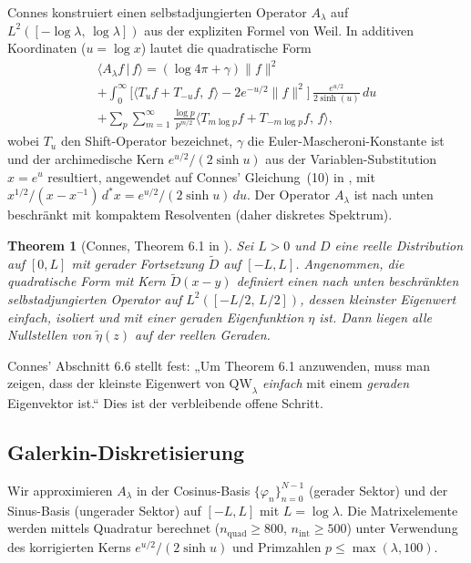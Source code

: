 \documentclass[12pt,a4paper]{article}
\newtheorem{theorem}{Theorem}[section]
\theoremstyle{definition}
\theoremstyle{remark}
\begin{document}
Connes konstruiert einen selbstadjungierten Operator $A_\lambda$ auf $L^2([-\log\lambda,\,\log\lambda])$ aus der expliziten Formel von Weil. In additiven Koordinaten ($u = \log x$) lautet die quadratische Form
\begin{multline*}
  \langle A_\lambda f \,|\, f \rangle = (\log 4\pi + \gamma)\|f\|^2 \\
  + \int_0^\infty \Big[\langle T_u f + T_{-u} f,\, f \rangle - 2e^{-u/2}\|f\|^2\Big]\,\frac{e^{u/2}}{2\sinh(u)}\,du \\
  + \sum_p \sum_{m=1}^\infty \frac{\log p}{p^{m/2}} \langle T_{m\log p} f + T_{-m\log p} f,\, f \rangle,
\end{multline*}
wobei $T_u$ den Shift-Operator bezeichnet, $\gamma$ die Euler-Mascheroni-Konstante ist und der archimedische Kern $e^{u/2}/(2\sinh u)$ aus der Variablen-Substitution $x = e^u$ resultiert, angewendet auf Connes' Gleichung~(10) in \cite{Connes2025}, mit $x^{1/2}/(x-x^{-1})\,d^*\!x = e^{u/2}/(2\sinh u)\,du$. Der Operator $A_\lambda$ ist nach unten beschränkt mit kompaktem Resolventen (daher diskretes Spektrum).

\begin{theorem}[Connes, Theorem 6.1 in \cite{Connes2025}]
Sei $L > 0$ und $D$ eine reelle Distribution auf $[0,L]$ mit gerader Fortsetzung $\tilde{D}$ auf $[-L,L]$. Angenommen, die quadratische Form mit Kern $\tilde{D}(x-y)$ definiert einen nach unten beschränkten selbstadjungierten Operator auf $L^2([-L/2,\,L/2])$, dessen kleinster Eigenwert einfach, isoliert und mit einer geraden Eigenfunktion $\eta$ ist. Dann liegen alle Nullstellen von $\tilde{\eta}(z)$ auf der reellen Geraden.
\end{theorem}

\noindent Connes' Abschnitt 6.6 stellt fest: „Um Theorem 6.1 anzuwenden, muss man zeigen, dass der kleinste Eigenwert von $\mathrm{QW}_\lambda$ \emph{einfach} mit einem \emph{geraden} Eigenvektor ist.“ Dies ist der verbleibende offene Schritt.

\subsection{Galerkin-Diskretisierung}

Wir approximieren $A_\lambda$ in der Cosinus-Basis $\{\varphi_n\}_{n=0}^{N-1}$ (gerader Sektor) und der Sinus-Basis (ungerader Sektor) auf $[-L,L]$ mit $L = \log\lambda$. Die Matrixelemente werden mittels Quadratur berechnet ($n_{\mathrm{quad}} \geq 800$, $n_{\mathrm{int}} \geq 500$) unter Verwendung des korrigierten Kerns $e^{u/2}/(2\sinh u)$ und Primzahlen $p \leq \max(\lambda, 100)$.
\end{document}

